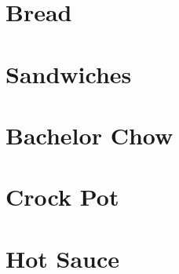 \documentclass{family_cookbook}
\begin{document}
\chapter{Bread}
\minitoc%
\clearpage


%



\chapter{Sandwiches}
\minitoc%
\clearpage





\chapter{Bachelor Chow}
\minitoc%
\clearpage





\chapter{Crock Pot}
\minitoc%
\clearpage



\chapter{Hot Sauce}
\minitoc%
\clearpage
{%

%	
%	
%	
}
\end{document}
